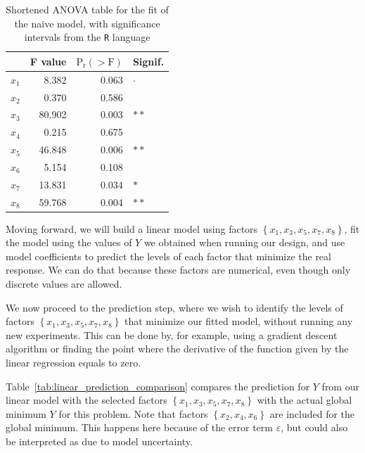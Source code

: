 \documentclass[conference]{IEEEtran}
\begin{document}
\begin{table}[t]
\centering
\caption{Shortened ANOVA table for the fit of the naive model, with significance intervals from the \texttt{R} language}
\label{tab:anova_linear}
\begingroup\small
\begin{tabular}{lrrl}
  \toprule
 & F value & $\text{P}_{\text{r}}(>\text{F})$ & Signif. \\
  \midrule
$x_1$ & 8.382 & 0.063 & $\cdot$ \\
  $x_2$ & 0.370 & 0.586 &   \\
  $x_3$ & 80.902 & 0.003 & $**$ \\
  $x_4$ & 0.215 & 0.675 &   \\
  $x_5$ & 46.848 & 0.006 & $**$ \\
  $x_6$ & 5.154 & 0.108 &   \\
  $x_7$ & 13.831 & 0.034 & $*$ \\
  $x_8$ & 59.768 & 0.004 & $**$ \\
   \bottomrule
\end{tabular}
\endgroup
\end{table}

Moving forward, we will build a linear model using factors
\(\left\{x_1,x_3,x_5,x_7,x_8\right\}\), fit the model using the values of \(Y\) we
obtained when running our design, and use model coefficients to predict the
levels of each factor that minimize the real response. We can do that because
these factors are numerical, even though only discrete values are allowed.

We now proceed to the prediction step, where we wish to identify the levels of
factors \(\left\{x_1,x_3,x_5,x_7,x_8\right\}\) that minimize our fitted model,
without running any new experiments. This can be done by, for example, using a
gradient descent algorithm or finding the point where the derivative of the
function given by the linear regression equals to zero.

Table~\ref{tab:linear_prediction_comparison} compares the prediction for
\(Y\) from our linear model with the selected factors
\(\left\{x_1,x_3,x_5,x_7,x_8\right\}\) with the actual global minimum \(Y\) for this
problem. Note that factors \(\left\{x_2,x_4,x_6\right\}\) are included for the
global minimum. This happens here because of the error term \(\varepsilon\), but
could also be interpreted as due to model uncertainty.
\end{document}
